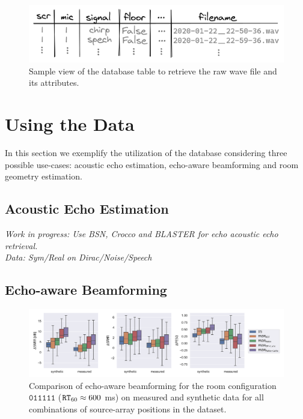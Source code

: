 \begin{figure}
    \centering
    \includegraphics[width=\linewidth]{figures/dechorate/database.png}
    \caption{Sample view of the database table to retrieve the raw wave file and its attributes.}
    \label{fig:dataset}
\end{figure}

\section{Using the Data}
In this section we exemplify the utilization of the database considering three possible use-cases: acoustic echo estimation, echo-aware beamforming and room geometry estimation.

\subsection{Acoustic Echo Estimation}
\textit{Work in progress:
Use BSN, Crocco and BLASTER for echo acoustic echo retrieval.
\\Data: Sym/Real on Dirac/Noise/Speech}


\subsection{Echo-aware Beamforming}

\begin{figure}[h]
    \centering
    \includegraphics[trim={0 10 10 0},clip,width=\linewidth]
    {figures/dechorate/kowalkzy_results_boxplot.pdf}
    \caption{
    Comparison of echo-aware beamforming for the room configuration $\mathtt{011111}$ ($\mathtt{RT}_{60} \approx 600 $ ms) on measured and synthetic data  for all combinations of source-array positions in the \dEchorate{} dataset.}
    \label{fig:pesq}
\end{figure}


